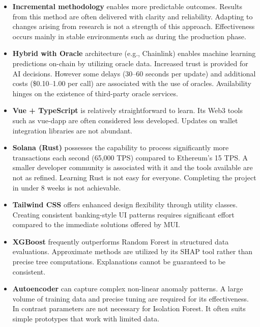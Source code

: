 \documentclass[12pt,a4paper]{report}
\begin{document}
\begin{itemize}[noitemsep]
\item \textbf{Incremental methodology} enables more predictable outcomes. Results from this method are often delivered with clarity and reliability. Adapting to changes arising from research is not a strength of this approach. Effectiveness occurs mainly in stable environments such as during the production phase.

\item \textbf{Hybrid with Oracle} architecture (e.g., Chainlink) enables machine learning predictions on-chain by utilizing oracle data. Increased trust is provided for AI decisions. However some delays (30--60 seconds per update) and additional costs (\$0.10--1.00 per call) are associated with the use of oracles. Availability hinges on the existence of third-party oracle services.

\item \textbf{Vue + TypeScript} is relatively straightforward to learn. Its Web3 tools such as vue-dapp are often considered less developed. Updates on wallet integration libraries are not abundant.

\item \textbf{Solana (Rust)} possesses the capability to process significantly more transactions each second (65,000 TPS) compared to Ethereum's 15 TPS. A smaller developer community is associated with it and the tools available are not as refined. Learning Rust is not easy for everyone. Completing the project in under 8 weeks is not achievable.

\item \textbf{Tailwind CSS} offers enhanced design flexibility through utility classes. Creating consistent banking-style UI patterns requires significant effort compared to the immediate solutions offered by MUI.

\item \textbf{XGBoost} frequently outperforms Random Forest in structured data evaluations. Approximate methods are utilized by its SHAP tool rather than precise tree computations. Explanations cannot be guaranteed to be consistent.

\item \textbf{Autoencoder} can capture complex non-linear anomaly patterns. A large volume of training data and precise tuning are required for its effectiveness. In contrast parameters are not necessary for Isolation Forest. It often suits simple prototypes that work with limited data.


\end{itemize}
\end{document}

